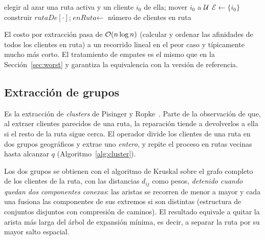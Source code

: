 \begin{algorithm}[H]
\caption{ ()}
\label{alg:shaw}
elegir al azar una ruta activa y un cliente $i_0$ de ella; mover $i_0$ a $\mathcal{U}$\;
$\mathcal{E}\gets\{i_0\}$ 
construir $\textit{rutaDe}[\cdot]$;\quad $\textit{enRuta}\gets$ número de clientes en ruta\;
\end{algorithm}

El costo por extracción pasa de $\mathcal{O}(n\log n)$ (calcular y ordenar las afinidades de todos
los clientes en ruta) a un recorrido lineal en el peor caso y típicamente mucho más corto. El
tratamiento de empates es el mismo que en la Sección~\ref{sec:worst} y garantiza la
equivalencia con la versión de referencia.

\subsection{Extracción de grupos}
\label{sec:cluster}

Es la extracción de \emph{clusters} de Pisinger y Ropke~\cite{pisinger2007}. Parte de la
observación de que, al extraer clientes parecidos de una ruta, la reparación tiende a
devolverlos a ella si el resto de la ruta sigue cerca. El operador divide los clientes de una
ruta en dos grupos geográficos y extrae uno \emph{entero}, y repite el proceso en rutas
vecinas hasta alcanzar $q$ (Algoritmo~\ref{alg:cluster}).

Los dos grupos se obtienen con el algoritmo de Kruskal sobre el grafo completo de los clientes
de la ruta, con las distancias $d_{ij}$ como pesos, \emph{detenido cuando quedan dos
componentes conexas}: las aristas se recorren de menor a mayor y cada una fusiona las
componentes de sus extremos si son distintas (estructura de conjuntos disjuntos con
compresión de caminos). El resultado equivale a quitar la arista más larga del árbol de
expansión mínima, es decir, a separar la ruta por su mayor salto espacial.

